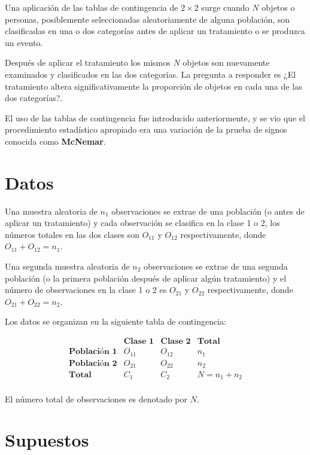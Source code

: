 \documentclass[
  a4paper,
  oneside,
  openany]{book}
\begin{document}
Una aplicación de las tablas de contingencia de \(2 \times 2\) surge cuando \(N\) objetos o personas, posiblemente seleccionadas aleatoriamente de alguna población, son clasificadas en una o dos categorías antes de aplicar un tratamiento o se produzca un evento.

Después de aplicar el tratamiento los mismos \(N\) objetos son nuevamente examinados y clasificados en las dos categorías. La pregunta a responder es ¿El tratamiento altera significativamente la proporción de objetos en cada una de las dos categorías?.

El uso de las tablas de contingencia fue introducido anteriormente, y se vio que el procedimiento estadístico apropiado era una variación de la prueba de signos conocida como \textbf{McNemar}.

\hypertarget{datos-10}{%
\section{Datos}\label{datos-10}}

Una muestra aleatoria de \(n_{1}\) observaciones se extrae de una población (o antes de aplicar un tratamiento) y cada observación se clasifica en la clase 1 o 2, los números totales en las dos clases son \(O_{11}\) y \(O_{12}\) respectivamente, donde \(O_{11} + O_{12}= n_{1}\).

Una segunda muestra aleatoria de \(n_{2}\) observaciones se extrae de una segunda población (o la primera población después de aplicar algún tratamiento) y el número de observaciones en la clase 1 o 2 es \(O_{21}\) y \(O_{22}\) respectivamente, donde \(O_{21} +O_{22}=n_{2}\).

Los datos se organizan en la siguiente tabla de contingencia:

\[
\begin{array}{c|c|c|c}
 & \textbf{Clase 1} & \textbf{Clase 2} & \textbf{Total}     \\
\hline
\textbf{Población 1} & O_{11} & O_{12} & n_{1}   \\
\hline
\textbf{Población 2} & O_{21} & O_{22} & n_{2}\\
\hline
\textbf{Total}       & C_{1} & C_{2}   & N=n_{1}+n_{2} \\
\end{array}
\]

El número total de observaciones es denotado por \(N\).

\hypertarget{supuestos-9}{%
\section{Supuestos}\label{supuestos-9}}
\end{document}
